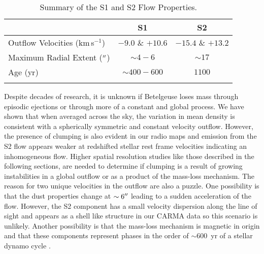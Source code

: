 \begin{table}[!t]
\begin{center}
\caption[Summary of the S1 and S2 Flow Properties]
{Summary of the S1 and S2 Flow Properties.}
\begin{tabular}{lcc}
\hline
\hline
\rule{0pt}{2.5ex} & S1 & S2 \\
\hline
Outflow Velocities (km\,s$^{-1}$) & $-9.0$ \& $+10.6$ & $-15.4$ \& $+13.2$ \\
Maximum Radial Extent ($^{\prime\prime}$) & $\sim4 - 6$ & $\sim 17$ \\
Age (yr) & $\sim 400 - 600$ & $1100$ \\
\hline
\rule{0pt}{2.0ex}
\end{tabular}
\label{tab:5.2}
\end{center}
\vspace{-0.5cm}
\end{table}

Despite decades of research, it is unknown if Betelgeuse loses mass through episodic ejections or through more of a constant and global process. We have shown that when averaged across the sky, the variation in mean density is consistent with a spherically symmetric and constant velocity outflow. However, the presence of clumping is also evident in our radio maps and emission from the S2 flow appears weaker at redshifted stellar rest frame velocities indicating an inhomogeneous flow. Higher spatial resolution studies like those described in the following sections, are needed to determine if clumping is a result of growing instabilities in a global outflow or as a product of the mass-loss mechanism. The reason for two unique velocities in the outflow are also a puzzle. One possibility is that the dust properties change at $\sim 6^{\prime\prime}$ leading to a sudden acceleration of the flow. However, the S2 component has a small velocity dispersion along the line of sight \citep{bernat_1979} and appears as a shell like structure in our CARMA data so this scenario is unlikely. Another possibility is that the mass-loss mechanism is magnetic in origin and that these components represent phases in the order of $\sim 600$\, yr of a stellar dynamo cycle \citep{harper_2013b}. 

